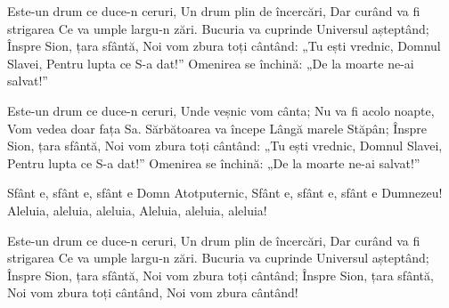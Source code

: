 \beginverse
Este-un drum ce duce-n ceruri,
Un drum plin de încercări,
Dar curând va fi strigarea
Ce va umple largu-n zări.
Bucuria va cuprinde
Universul așteptând;
Înspre Sion, țara sfântă,
Noi vom zbura toți cântând:
„Tu ești vrednic, Domnul Slavei,
Pentru lupta ce S-a dat!”
Omenirea se închină:
„De la moarte ne-ai salvat!”
\endverse

\beginverse
Este-un drum ce duce-n ceruri,
Unde veșnic vom cânta;
Nu va fi acolo noapte,
Vom vedea doar fața Sa.
Sărbătoarea va începe
Lângă marele Stăpân;
Înspre Sion, țara sfântă,
Noi vom zbura toți cântând:
„Tu ești vrednic, Domnul Slavei,
Pentru lupta ce S-a dat!”
Omenirea se închină:
„De la moarte ne-ai salvat!”
\endverse

\beginchorus
Sfânt e, sfânt e, sfânt e
Domn Atotputernic,
Sfânt e, sfânt e, sfânt e
Dumnezeu!
Aleluia, aleluia, aleluia,
Aleluia, aleluia, aleluia!
\endchorus

\beginverse
Este-un drum ce duce-n ceruri,
Un drum plin de încercări,
Dar curând va fi strigarea
Ce va umple largu-n zări.
Bucuria va cuprinde
Universul așteptând;
Înspre Sion, țara sfântă,
Noi vom zbura toți cântând;
Înspre Sion, țara sfântă,
Noi vom zbura toți cântând,
Noi vom zbura cântând!
\endverse
\endsong